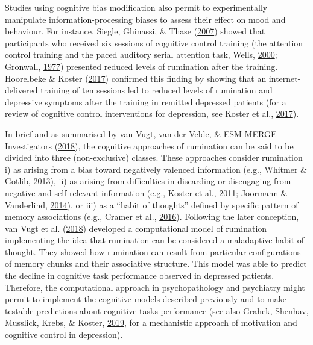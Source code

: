 \documentclass[a4paper,12pt,twoside,onecolumn,openright,final,oldfontcommands]{memoir}
\begin{document}
Studies using cognitive bias modification also permit to experimentally manipulate information-processing biases to assess their effect on mood and behaviour. For instance, Siegle, Ghinassi, \& Thase (\protect\hyperlink{ref-siegle_neurobehavioral_2007}{2007}) showed that participants who received six sessions of cognitive control training (the attention control training and the paced auditory serial attention task, Wells, \protect\hyperlink{ref-wells_emotional_2000}{2000}; Gronwall, \protect\hyperlink{ref-gronwall_paced_1977}{1977}) presented reduced levels of rumination after the training. Hoorelbeke \& Koster (\protect\hyperlink{ref-hoorelbeke_internet-delivered_2017}{2017}) confirmed this finding by showing that an internet-delivered training of ten sessions led to reduced levels of rumination and depressive symptoms after the training in remitted depressed patients (for a review of cognitive control interventions for depression, see Koster et al., \protect\hyperlink{ref-koster_cognitive_2017}{2017}).

In brief and as summarised by van Vugt, van der Velde, \& ESM-MERGE Investigators (\protect\hyperlink{ref-van_vugt_how_2018}{2018}), the cognitive approaches of rumination can be said to be divided into three (non-exclusive) classes. These approaches consider rumination i) as arising from a bias toward negatively valenced information (e.g., Whitmer \& Gotlib, \protect\hyperlink{ref-Whitmer2013}{2013}), ii) as arising from difficulties in discarding or disengaging from negative and self-relevant information (e.g., Koster et al., \protect\hyperlink{ref-Koster2011}{2011}; Joormann \& Vanderlind, \protect\hyperlink{ref-joormann_emotion_2014}{2014}), or iii) as a \enquote{habit of thoughts} defined by specific pattern of memory associations (e.g., Cramer et al., \protect\hyperlink{ref-cramer_major_2016}{2016}). Following the later conception, van Vugt et al. (\protect\hyperlink{ref-van_vugt_how_2018}{2018}) developed a computational model of rumination implementing the idea that rumination can be considered a maladaptive habit of thought. They showed how rumination can result from particular configurations of memory chunks and their associative structure. This model was able to predict the decline in cognitive task performance observed in depressed patients. Therefore, the computational approach in psychopathology and psychiatry might permit to implement the cognitive models described previously and to make testable predictions about cognitive tasks performance (see also Grahek, Shenhav, Musslick, Krebs, \& Koster, \protect\hyperlink{ref-grahek_motivation_2019}{2019}, for a mechanistic approach of motivation and cognitive control in depression).
\end{document}
